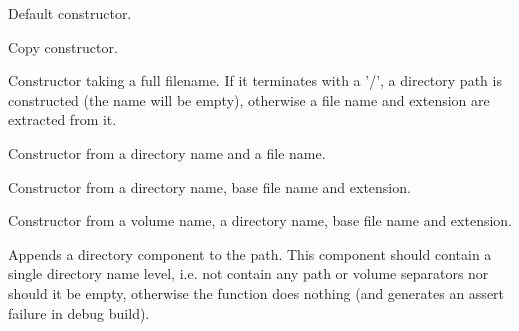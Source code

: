 

\label{wxfilenamewxfilename}


Default constructor.


Copy constructor.


Constructor taking a full filename. If it terminates with a '/', a directory path
is constructed (the name will be empty), otherwise a file name and
extension are extracted from it.


Constructor from a directory name and a file name.


Constructor from a directory name, base file name and extension.


Constructor from a volume name, a directory name, base file name and extension.


\label{wxfilenameappenddir}


Appends a directory component to the path. This component should contain a
single directory name level, i.e. not contain any path or volume separators nor
should it be empty, otherwise the function does nothing (and generates an
assert failure in debug build).


\label{wxfilenameassign}




